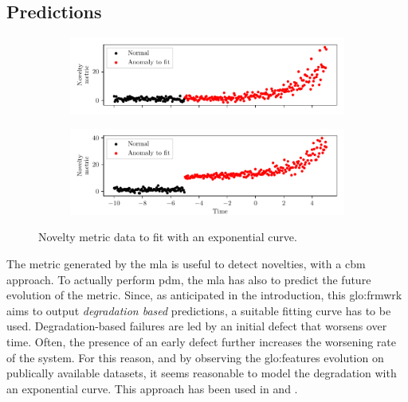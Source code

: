 \subsection{Predictions}
\label{sec:predictions}
\begin{figure}
    \centering
    \begin{subfigure}{\textwidth}
        \includegraphics[width=\linewidth]{images/Framework/EXP_1.pdf}
        \caption{}
        \label{fig:exp_degradation_1}
    \end{subfigure}
    \begin{subfigure}{\textwidth}
        \includegraphics[width=\linewidth]{images/Framework/EXP_2.pdf}
        \caption{}
        \label{fig:exp_degradation_2}
    \end{subfigure}
    \caption{Novelty metric data to fit with an exponential curve.}
    \label{fig:mainfig}
    \label{fig:exp_degradation}
\end{figure}

The metric generated by the \gls{mla} is useful to detect novelties, with a \gls{cbm} approach. To actually perform \gls{pdm}, the \gls{mla} has also to predict the future evolution of the metric. Since, as anticipated in the introduction, this \gls{glo:frmwrk} aims to output \emph{degradation based} predictions, a suitable fitting curve has to be used. Degradation-based failures are led by an initial defect that worsens over time. Often, the presence of an early defect further increases the worsening rate of the system. For this reason, and by observing the \gls{glo:feature}s evolution on publically available datasets, it seems reasonable to model the degradation with an exponential curve. This approach has been used in \cite{exp_degradation} and \cite{exp_degradation_NeuralNN}.

